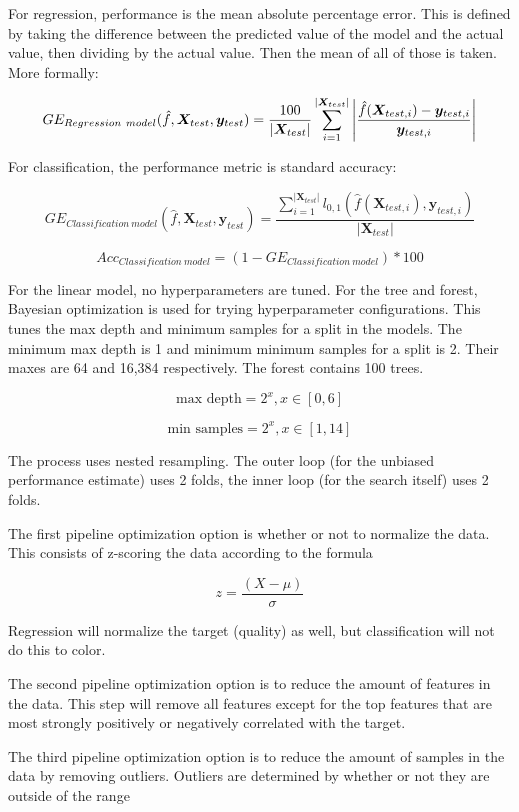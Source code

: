 \documentclass[12pt, letterpaper]{article}
\begin{document}
For regression, performance is the mean absolute percentage error. This is defined by taking the difference between the predicted value of the model and the actual value, then dividing by the actual value. Then the mean of all of those is taken. More formally:

$$
    GE_{Regression\ model}(\hat{f}, \bm{X}_{test}, \bm{y}_{test}) = \frac{100}{|\bm{X}_{test}|} \sum_{i=1}^{|\bm{X}_{test}|} \abs{\frac{\hat{f}(\bm{X}_{test,i}) - \bm{y}_{test,i}}{\bm{y}_{test,i}}}
$$

For classification, the performance metric is standard accuracy:

$$
    GE_{Classification\ model}(\hat{f}, \bm{X}_{test}, \bm{y}_{test}) = \frac{\sum_{i=1}^{|\bm{X}_{test}|}l_{0,1}(\hat{f}(\bm{X}_{test,i}), \bm{y}_{test,i})}{|\bm{X}_{test}|}
$$

$$
Acc_{Classification\ model} = (1 - GE_{Classification\ model}) * 100
$$

For the linear model, no hyperparameters are tuned. For the tree and forest, Bayesian optimization is used for trying hyperparameter configurations. This tunes the max depth and minimum samples for a split in the models. The minimum max depth is 1 and minimum minimum samples for a split is 2. Their maxes are 64 and 16,384 respectively. The forest contains 100 trees.

$$
\text{max depth} = 2^x, x \in [0,6]
$$

$$
\text{min samples} = 2^x, x \in [1,14]
$$

The process uses nested resampling. The outer loop (for the unbiased performance estimate) uses 2 folds, the inner loop (for the search itself) uses 2 folds.

The first pipeline optimization option is whether or not to normalize the data. This consists of z-scoring the data according to the formula

$$
z = \frac{(X - \mu)}{\sigma}
$$

Regression will normalize the target (quality) as well, but classification will not do this to color.

The second pipeline optimization option is to reduce the amount of features in the data. This step will remove all features except for the top features that are most strongly positively or negatively correlated with the target.

The third pipeline optimization option is to reduce the amount of samples in the data by removing outliers. Outliers are determined by whether or not they are outside of the range
\end{document}

